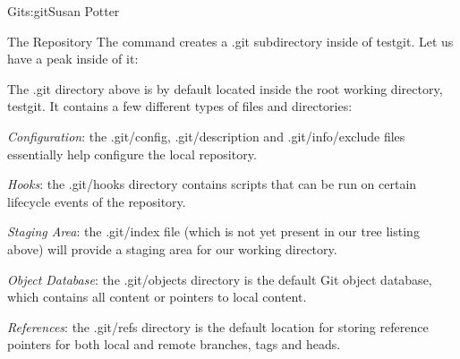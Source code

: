 \begin{aosachapter}{Git}{s:git}{Susan Potter}
\begin{aosasect1}{The Repository}
The  command creates a .git subdirectory inside of testgit.
Let us have a peak inside of it:
\begin{aosaitemize}
  \item {}\newline
\end{aosaitemize}

The .git directory above is by default located inside the root working
directory, testgit. It contains a few different types of files and
directories:

\begin{aosaitemize}
  \item \emph{Configuration}: the .git/config, .git/description and
  .git/info/exclude files essentially help configure the local repository.
  \item \emph{Hooks}: the .git/hooks directory contains scripts that can
  be run on certain lifecycle events of the repository.
  \item \emph{Staging Area}: the .git/index file (which is not yet
  present in our tree listing above) will provide a staging area for our
  working directory.
  \item \emph{Object Database}: the .git/objects directory is the default
  Git object database, which contains all content or pointers to local
  content.
  \item \emph{References}: the .git/refs directory is the default location
  for storing reference pointers for both local and remote branches, tags and
  heads.
\end{aosaitemize}


\end{aosasect1}
\end{aosachapter}
